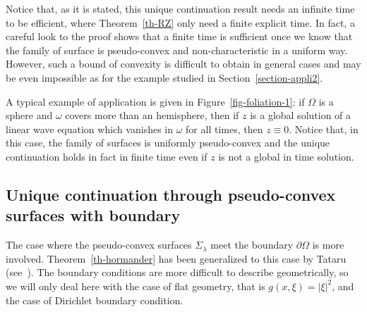 \documentclass[AHL,Unicode,longabstracts]{cedram}
\begin{document}
Notice that, as it is stated, this unique continuation result needs an infinite time to be efficient, where Theorem~\ref{th-RZ} only need a finite explicit time. In fact, a careful look to the proof shows that a finite time is sufficient once we know that the family of surface is pseudo-convex and non-characteristic in a uniform way. However, such a bound of convexity is difficult to obtain in general cases and may be even impossible as for the example studied in Section~\ref{section-appli2}.


A typical example of application is given in Figure~\ref{fig-foliation-1}: if $\Omega$ is a sphere and $\omega$ covers more than an hemisphere, then if $z$ is a global solution of a linear wave equation which vanishes in $\omega$ for all times, then $z\equiv 0$. Notice that, in this case, the family of surfaces is uniformly pseudo-convex and the unique continuation holds in fact in finite time even if $z$ is not a global in time solution.



\subsection{Unique continuation through pseudo-convex surfaces with boundary}

The case where the pseudo-convex surfaces $\Sigma_\lambda$ meet the boundary $\partial\Omega$ is more involved. Theorem~\ref{th-hormander} has been generalized to this case by Tataru (see~\cite{Tataru_uniq_analyticCPDE, Tataru, Tataru_uniq_analyticJMPA}). The boundary conditions are more difficult to describe geometrically, so we will only deal here with the case of flat geometry, that is $g(x,\xi)=|\xi|^2$, and the case of Dirichlet boundary condition.
\end{document}
